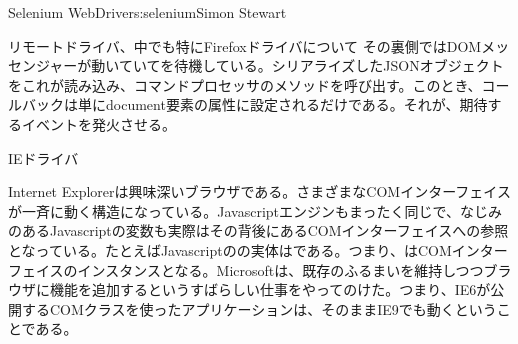 \begin{aosachapter}{Selenium WebDriver}{s:selenium}{Simon Stewart}
\begin{aosasect1}{リモートドライバ、中でも特にFirefoxドライバについて}
その裏側ではDOMメッセンジャーが動いていてを待機している。シリアライズしたJSONオブジェクトをこれが読み込み、コマンドプロセッサのメソッドを呼び出す。このとき、コールバックは単にdocument要素の属性に設定されるだけである。それが、期待するイベントを発火させる。

\end{aosasect1}

\begin{aosasect1}{IEドライバ}

Internet Explorerは興味深いブラウザである。さまざまなCOMインターフェイスが一斉に動く構造になっている。Javascriptエンジンもまったく同じで、なじみのあるJavascriptの変数も実際はその背後にあるCOMインターフェイスへの参照となっている。たとえばJavascriptのの実体はである。つまり、はCOMインターフェイスのインスタンスとなる。Microsoftは、既存のふるまいを維持しつつブラウザに機能を追加するというすばらしい仕事をやってのけた。つまり、IE6が公開するCOMクラスを使ったアプリケーションは、そのままIE9でも動くということである。


\end{aosasect1}
\end{aosachapter}
